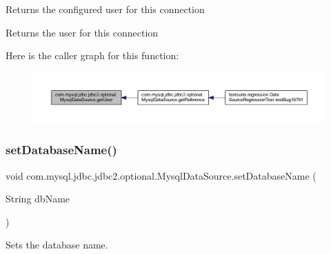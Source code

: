 Returns the configured user for this connection

\begin{DoxyReturn}{Returns}
the user for this connection 
\end{DoxyReturn}
Here is the caller graph for this function\+:
\nopagebreak
\begin{figure}[H]
\begin{center}
\leavevmode
\includegraphics[width=350pt]{classcom_1_1mysql_1_1jdbc_1_1jdbc2_1_1optional_1_1_mysql_data_source_a91ebbda8d7cd1ddd53bf681738155854_icgraph}
\end{center}
\end{figure}
\mbox{\label{classcom_1_1mysql_1_1jdbc_1_1jdbc2_1_1optional_1_1_mysql_data_source_a3edec7449e5a731ccc6e72270e8baa66}} 
\subsubsection{\texorpdfstring{set\+Database\+Name()}{setDatabaseName()}}
{\footnotesize\ttfamily void com.\+mysql.\+jdbc.\+jdbc2.\+optional.\+Mysql\+Data\+Source.\+set\+Database\+Name (\begin{DoxyParamCaption}\item[{String}]{db\+Name }\end{DoxyParamCaption})}

Sets the database name.


